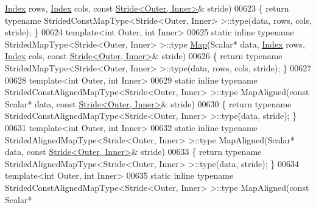\begin{DoxyCode}
      \hyperlink{namespace_eigen_a62e77e0933482dafde8fe197d9a2cfde}{Index} rows, \hyperlink{namespace_eigen_a62e77e0933482dafde8fe197d9a2cfde}{Index} cols, \textcolor{keyword}{const} \hyperlink{group___core___module_class_eigen_1_1_stride}{Stride<Outer, Inner>}& stride)
00623     \{ \textcolor{keywordflow}{return} \textcolor{keyword}{typename} StridedConstMapType<Stride<Outer, Inner> >::type(data, rows, cols, stride); \}
00624     \textcolor{keyword}{template}<\textcolor{keywordtype}{int} Outer, \textcolor{keywordtype}{int} Inner>
00625     \textcolor{keyword}{static} \textcolor{keyword}{inline} \textcolor{keyword}{typename} StridedMapType<Stride<Outer, Inner> >::type \hyperlink{group___core___module_class_eigen_1_1_map}{Map}(Scalar* data, 
      \hyperlink{namespace_eigen_a62e77e0933482dafde8fe197d9a2cfde}{Index} rows, \hyperlink{namespace_eigen_a62e77e0933482dafde8fe197d9a2cfde}{Index} cols, \textcolor{keyword}{const} \hyperlink{group___core___module_class_eigen_1_1_stride}{Stride<Outer, Inner>}& stride)
00626     \{ \textcolor{keywordflow}{return} \textcolor{keyword}{typename} StridedMapType<Stride<Outer, Inner> >::type(data, rows, cols, stride); \}
00627 
00628     \textcolor{keyword}{template}<\textcolor{keywordtype}{int} Outer, \textcolor{keywordtype}{int} Inner>
00629     \textcolor{keyword}{static} \textcolor{keyword}{inline} \textcolor{keyword}{typename} StridedConstAlignedMapType<Stride<Outer, Inner> >::type MapAligned(\textcolor{keyword}{const} Scalar*
       data, \textcolor{keyword}{const} \hyperlink{group___core___module_class_eigen_1_1_stride}{Stride<Outer, Inner>}& stride)
00630     \{ \textcolor{keywordflow}{return} \textcolor{keyword}{typename} StridedConstAlignedMapType<Stride<Outer, Inner> >::type(data, stride); \}
00631     \textcolor{keyword}{template}<\textcolor{keywordtype}{int} Outer, \textcolor{keywordtype}{int} Inner>
00632     \textcolor{keyword}{static} \textcolor{keyword}{inline} \textcolor{keyword}{typename} StridedAlignedMapType<Stride<Outer, Inner> >::type MapAligned(Scalar* data, \textcolor{keyword}{
      const} \hyperlink{group___core___module_class_eigen_1_1_stride}{Stride<Outer, Inner>}& stride)
00633     \{ \textcolor{keywordflow}{return} \textcolor{keyword}{typename} StridedAlignedMapType<Stride<Outer, Inner> >::type(data, stride); \}
00634     \textcolor{keyword}{template}<\textcolor{keywordtype}{int} Outer, \textcolor{keywordtype}{int} Inner>
00635     \textcolor{keyword}{static} \textcolor{keyword}{inline} \textcolor{keyword}{typename} StridedConstAlignedMapType<Stride<Outer, Inner> >::type MapAligned(\textcolor{keyword}{const} Scalar*

\end{DoxyCode}
